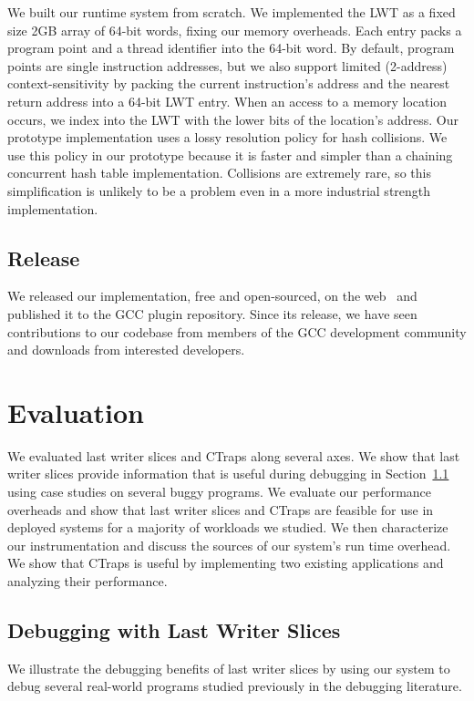 \documentclass[preprint,9pt]{sigplanconf}
\newcommand{\ctraps}{CTraps\xspace}
\begin{document}
We built our runtime system from scratch.  We implemented the LWT as a fixed
size 2GB array of 64-bit words, fixing our memory overheads.  Each entry packs a program point and a thread
identifier into the 64-bit word.  By default, program points are single
instruction addresses, but we also support limited (2-address)
context-sensitivity by packing the current instruction's address and the
nearest return address into a 64-bit LWT entry. When an access to a memory
location occurs, we index into the LWT with the lower bits of the location's
address.  Our prototype implementation uses a lossy resolution policy for hash
collisions.  We use this policy in our prototype because it is faster and
simpler than a chaining concurrent hash table implementation.  Collisions are
extremely rare, so this simplification is unlikely to be a problem even in a
more industrial strength implementation.  

\subsection{Release}
We released our implementation, free and open-sourced, on the
web~\cite{withheldforanonymity} and published it to the GCC plugin repository.
Since its release, we have seen contributions to our codebase from members of
the GCC development community and downloads from interested developers.

\section{Evaluation}
\label{sec:eval}
We evaluated last writer slices and \ctraps along several axes.  We show that
last writer slices provide information that is useful during debugging in
Section~\ref{sec:eval:debugging} using case studies on several buggy programs.
We evaluate our performance overheads and show that last writer slices and
\ctraps are feasible for use in deployed systems for a majority of workloads we
studied.  We then characterize our instrumentation and discuss the sources of
our system's run time overhead.   We show that \ctraps is useful by
implementing two existing applications and analyzing their performance.    

\subsection{Debugging with Last Writer Slices}
\label{sec:eval:debugging}
We illustrate the debugging benefits of last writer slices by using our system
to debug several real-world programs studied previously in the debugging
literature.    
\end{document}
